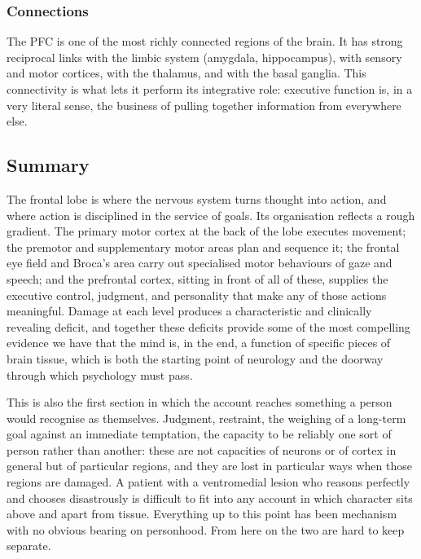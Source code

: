 \documentclass[11pt]{article}
\begin{document}
\subsubsection{Connections}

The PFC is one of the most richly connected regions of the brain. It has strong reciprocal links with the limbic system (amygdala, hippocampus), with sensory and motor cortices, with the thalamus, and with the basal ganglia. This connectivity is what lets it perform its integrative role: executive function is, in a very literal sense, the business of pulling together information from everywhere else.

\subsection{Summary}

The frontal lobe is where the nervous system turns thought into action, and where action is disciplined in the service of goals. Its organisation reflects a rough gradient. The primary motor cortex at the back of the lobe executes movement; the premotor and supplementary motor areas plan and sequence it; the frontal eye field and Broca's area carry out specialised motor behaviours of gaze and speech; and the prefrontal cortex, sitting in front of all of these, supplies the executive control, judgment, and personality that make any of those actions meaningful. Damage at each level produces a characteristic and clinically revealing deficit, and together these deficits provide some of the most compelling evidence we have that the mind is, in the end, a function of specific pieces of brain tissue, which is both the starting point of neurology and the doorway through which psychology must pass.

This is also the first section in which the account reaches something a person would recognise as themselves. Judgment, restraint, the weighing of a long-term goal against an immediate temptation, the capacity to be reliably one sort of person rather than another: these are not capacities of neurons or of cortex in general but of particular regions, and they are lost in particular ways when those regions are damaged. A patient with a ventromedial lesion who reasons perfectly and chooses disastrously is difficult to fit into any account in which character sits above and apart from tissue. Everything up to this point has been mechanism with no obvious bearing on personhood. From here on the two are hard to keep separate.
\end{document}
